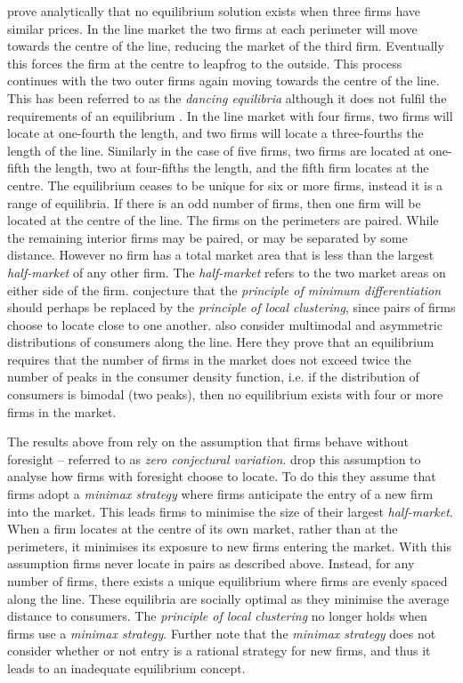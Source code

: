 \documentclass[preprint, 12pt]{elsarticle}
\begin{document}
\citet{Eaton_Lipsey_1975} prove analytically that no equilibrium solution exists when three firms have similar prices. In the line market the two firms at each perimeter will move towards the centre of the line, reducing the market of the third firm. Eventually this forces the firm at the centre to leapfrog to the outside. This process continues with the two outer firms again moving towards the centre of the line. This has been referred to as the \emph{dancing equilibria} although it does not fulfil the requirements of an equilibrium \citep{Eiselt_2011}. In the line market with four firms, two firms will locate at one-fourth the length, and two firms will locate a three-fourths the length of the line. Similarly in the case of five firms, two firms are located at one-fifth the length, two at four-fifths the length, and the fifth firm locates at the centre. The equilibrium ceases to be unique for six or more firms, instead it is a range of equilibria. If there is an odd number of firms, then one firm will be located at the centre of the line. The firms on the perimeters are paired. While the remaining interior firms may be paired, or may be separated by some distance. However no firm has a total market area that is less than the largest \emph{half-market} of any other firm. The \emph{half-market} refers to the two market areas on either side of the firm. \citet{Eaton_Lipsey_1975} conjecture that the \emph{principle of minimum differentiation} should perhaps be replaced by the \emph{principle of local clustering}, since pairs of firms choose to locate close to one another. \citet{Eaton_Lipsey_1975} also consider multimodal and asymmetric distributions of consumers along the line. Here they prove that an equilibrium requires that the number of firms in the market does not exceed twice the number of peaks in the consumer density function, i.e. if the distribution of consumers is bimodal (two peaks), then no equilibrium exists with four or more firms in the market. 

The results above from \citet{Eaton_Lipsey_1975} rely on the assumption that firms behave without foresight -- referred to as \emph{zero conjectural variation}. \citet{Eaton_Lipsey_1975} drop this assumption to analyse how firms with foresight choose to locate. To do this they assume that firms adopt a \emph{minimax strategy} where firms anticipate the entry of a new firm into the market. This leads firms to minimise the size of their largest \emph{half-market}. When a firm locates at the centre of its own market, rather than at the perimeters, it minimises its exposure to new firms entering the market. With this assumption firms never locate in pairs as described above. Instead, for any number of firms, there exists a unique equilibrium where firms are evenly spaced along the line. These equilibria are socially optimal as they minimise the average distance to consumers. The \emph{principle of local clustering} no longer holds when firms use a \emph{minimax strategy}. Further note that the \emph{minimax strategy} does not consider whether or not entry is a rational strategy for new firms, and thus it leads to an inadequate equilibrium concept.
\end{document}

